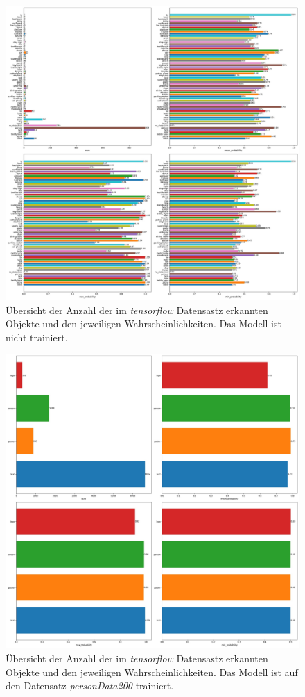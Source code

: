 \documentclass[a4paper,12pt,ngerman]{article}
\begin{document}
\newpage
\begin{figure}[ht]
\includegraphics[width=\linewidth]{Analyse_untrainiert}
\centering
\caption{Übersicht der Anzahl der im \textit{tensorflow} Datensastz erkannten Objekte und den jeweiligen Wahrscheinlichkeiten. Das Modell ist nicht trainiert.}
\end{figure}

\newpage
\begin{figure}[ht]
\includegraphics[width=\linewidth]{Analyse_trainiert_(PersonData200)}
\centering
\caption{Übersicht der Anzahl der im \textit{tensorflow} Datensastz erkannten Objekte und den jeweiligen Wahrscheinlichkeiten. Das Modell ist auf den Datensatz \textit{personData200} trainiert.}
\end{figure}
\end{document}
